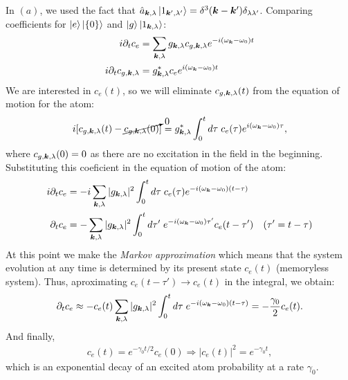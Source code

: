In $(a)$, we used the fact that $\hat{a}_{\bm{k},\lambda}\left|1_{\bm{k}',\lambda'}\right\rangle=\delta^3(\bm{k}-\bm{k}')\delta_{\lambda\lambda'}$. Comparing coefficients for 
$\left|e\right\rangle\left|\{0\}\right\rangle$ and $\left|g\right\rangle\left|1_{\bm{k},\lambda}\right\rangle$:
\begin{align*}
    i\partial_tc_e&=\sum_{\bm{k},\lambda}g_{\bm{k},\lambda}c_{g,\bm{k},\lambda}e^{-i(\omega_{\bm{k}}-\omega_0)t}\\
    i\partial_tc_{g,\bm{k},\lambda}&=g^*_{\bm{k},\lambda}c_ee^{i(\omega_{\bm{k}}-\omega_0)t}
\end{align*}
We are interested in $c_e(t)$, so we will eliminate $c_{g,\bm{k},\lambda}(t)$ from the equation of motion for the atom:
\begin{align}
    i[c_{g,\bm{k},\lambda}(t)-\cancelto{0}{c_{g,\bm{k},\lambda}(0)}]=g^*_{\bm{k},\lambda}\int_0^td\tau\;c_e(\tau)e^{i(\omega_{\bm{k}}-\omega_0)\tau},
\end{align}
where $c_{g,\bm{k},\lambda}(0)=0$ as there are no excitation in the field in the beginning. Substituting this coeficient in the equation of motion of the 
atom:
\begin{align*}
    i\partial_tc_e&=-i\sum_{\bm{k},\lambda}|g_{\bm{k},\lambda}|^2\int_0^td\tau\;c_e(\tau)e^{-i(\omega_{\bm{k}}-\omega_0)(t-\tau)}\\
    \partial_tc_e&=-\sum_{\bm{k},\lambda}|g_{\bm{k},\lambda}|^2\int_0^td\tau'\;e^{-i(\omega_{\bm{k}}-\omega_0)\tau'}c_e(t-\tau')\quad(\tau'=t-\tau)
\end{align*}
At this point we make the \emph{Markov approximation} which means that the system evolution at any time is determined by its present state $c_e(t)$
(memoryless system). Thus, aproximating $c_e(t-\tau')\to c_e(t)$ in the integral, we obtain:
\begin{align*}
    \partial_tc_e\approx-c_e(t)\sum_{\bm{k},\lambda}|g_{\bm{k},\lambda}|^2\int_0^td\tau\;e^{-i(\omega_{\bm{k}}-\omega_0)(t-\tau)}=-\frac{\gamma_0}{2}c_e(t). 
\end{align*}
And finally,
\begin{align}
    c_e(t)=e^{-\gamma_0t/2}c_e(0)\Longrightarrow |c_e(t)|^2=e^{-\gamma_0t},
\end{align}
which is an exponential decay of an excited atom probability at a rate $\gamma_0$.



